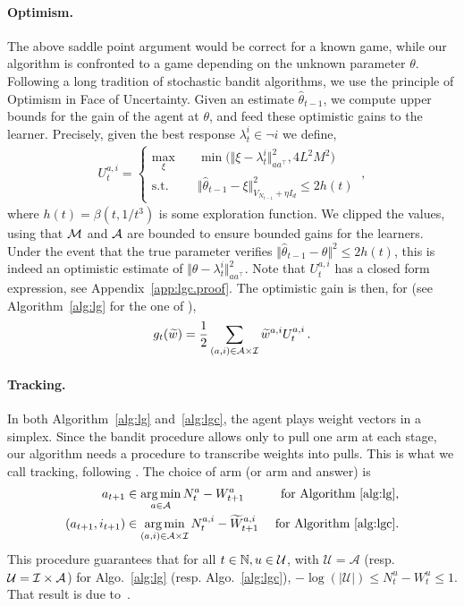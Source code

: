 \paragraph{Optimism.} The above saddle point argument would be correct for a known game, while our algorithm is confronted to a game depending on the unknown parameter $\theta$. Following a long tradition of stochastic bandit algorithms, we use the principle of Optimism in Face of Uncertainty. Given an estimate $\hat{\theta}_{t-1}$, we compute upper bounds for the gain of the agent at $\theta$, and feed these optimistic gains to the learner. Precisely, given the best response $\lambda_t^i \in \neg i$ we define,
\begin{align*}
U_t^{a,i} =\left\{
\begin{array}{ll}
\max_{\xi} \quad & \min\big(\Vert \xi - \lambda_t^i \Vert^2_{a a^\top},4L^2M^2\big)\\
\text{s.t.}\quad & \Vert \hat{\theta}_{t-1} - \xi \Vert^2_{V_{N_{t-1}}+\eta I_d} \le 2h(t)
\end{array}
\right. \: ,
\end{align*}
where $h(t)=\beta(t, 1/t^3)$ is some exploration function. We clipped the values, using that $\mathcal{M}$ and $\mathcal{A}$ are bounded to ensure bounded gains for the learners. Under the event that the true parameter verifies $\Vert \hat{\theta}_{t-1} - \theta \Vert^2 \le 2 h(t)$, this is indeed an optimistic estimate of $\Vert \theta - \lambda_t^i \Vert^2_{a a^\top}$. Note that $U_t^{a,i}$ has a closed form expression, see Appendix~\ref{app:lgc.proof}. The optimistic gain is then, for \LGC (see Algorithm~\ref{alg:lg} for the one of \LG),
\[
g_t(\widetilde{w}) = \frac{1}{2} \sum_{(a,i)\in\mathcal{A}\times\mathcal{I}}  \widetilde{w}^{a,i} U_t^{a,i}\,.
\]


\paragraph{Tracking.} In both Algorithm~\ref{alg:lg} and~\ref{alg:lgc}, the agent plays weight vectors in a simplex. Since the bandit procedure allows only to pull one arm at each stage, our algorithm needs a procedure to transcribe weights into pulls. This is what we call tracking, following \citet{garivier2016tracknstop}. The choice of arm (or arm and answer) is
\begin{align*}
a_{t+1}          &\in \operatorname*{arg\,min}_{a\in \mathcal A } N_{t}^{a} - W_{t+1}^{a} & \text{ for Algorithm~\ref{alg:lg},}\\
(a_{t+1},i_{t+1})&\in \operatorname*{arg\,min}_{(a,i)\in \mathcal A \times \mathcal I } N_{t}^{a,i} - \widetilde{W}_{t+1}^{a,i} & \text{ for Algorithm~\ref{alg:lgc}.}
\end{align*}
This procedure guarantees that for all $t\in{\mathbb N}, u \in \mathcal U$, with $\mathcal U = \mathcal A$ (resp. $\mathcal U =\mathcal{I}\times\mathcal{A}$) for Algo.~\ref{alg:lg} (resp. Algo.~\ref{alg:lgc}), $- \log (|\mathcal U|) \le N_t^{u} - W_t^{u} \le 1$. That result is due to~\citet{degenne2020structure}.

